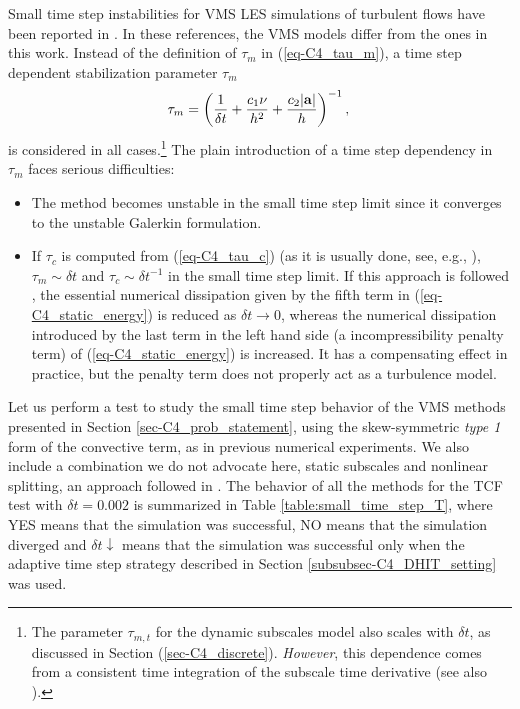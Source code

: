 Small time step instabilities for VMS LES simulations of turbulent flows have been reported in \cite{hsu_improving_2010,gamnitzer_time-dependent_2010}. In these references, the VMS models differ from the ones in this work. Instead of the definition of  $\tau_m$ in (\ref{eq-C4_tau_m}), a time step dependent stabilization parameter $\tau_m$
$$
\tau_m=\left(\frac{1}{\delta t} + \frac{c_1\nu}{h^2}+\frac{c_2|{\bf a}|}{h}\right)^{-1},\\
$$
is considered in all cases.\footnote{The parameter $\tau_{m,t}$ for the dynamic subscales model also
scales with $\delta t$, as discussed in Section (\ref{sec-C4_discrete}). {\it However}, this dependence comes from a consistent time integration of the subscale time derivative (see also \cite[Section 3.2]{codina_time_2007}).} The plain introduction of a time step dependency in $\tau_m$ faces serious difficulties:
\begin{itemize}
\item The method becomes unstable in the small time step limit since it converges to the unstable Galerkin formulation.
\item If $\tau_c$ is computed from (\ref{eq-C4_tau_c}) (as it is usually done, see, e.g., \cite{bazilevs_variational_2007,hsu_improving_2010,gamnitzer_time-dependent_2010,gravemeier_algebraic_2010}), $\tau_m \sim \delta t$ and $\tau_c \sim \delta t^{-1}$ in the small time step limit. If this approach is followed , the essential numerical dissipation given by the fifth term in (\ref{eq-C4_static_energy}) is reduced as $\delta t \to 0$, whereas the numerical dissipation introduced by the last term in the left hand side (a incompressibility penalty term) of (\ref{eq-C4_static_energy}) is increased. It has a compensating effect in practice, but the penalty term does not properly act as a turbulence model. %
\end{itemize}

Let us perform a test to study the small time step behavior of the VMS methods presented in Section \ref{sec-C4_prob_statement}, using the skew-symmetric \textit{type 1} form of the convective term, as in previous numerical experiments. We also include a combination we do not advocate here, static subscales and nonlinear splitting, an approach followed in \cite{Calo_2004,bazilevs_variational_2007,hsu_improving_2010,gamnitzer_time-dependent_2010,gravemeier_algebraic_2010}. %
The behavior of all the methods for the TCF test with $\delta t=0.002$ is summarized in Table \ref{table:small_time_step_T}, where YES means that the simulation was successful, NO means that the simulation diverged and $\delta t\downarrow$ means that the simulation was successful only when the adaptive time step strategy described in Section \ref{subsubsec-C4_DHIT_setting} was used.

